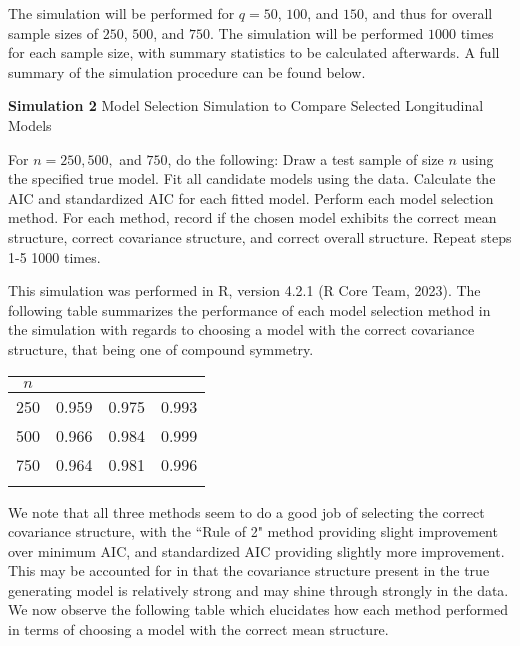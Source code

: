		The simulation will be performed for $q = 50$, $100$, and $150$, and thus for overall sample sizes of $250$, $500$, and $750$. The simulation will be performed $1000$ times for each sample size,
		with summary statistics to be calculated afterwards. A full summary of the simulation procedure can be found below.
		\begin{algorithm}[H]
			\caption*{\textbf{Simulation 2} Model Selection Simulation to Compare Selected Longitudinal Models}
			\begin{algorithmic}[1]
			  \Statex For $n = 250, 500,$ and $750$, do the following:
			  \State Draw a test sample of size $n$ using the specified true model.
			  \State Fit all candidate models using the data.
			  \State Calculate the AIC and standardized AIC for each fitted model.
			  \State Perform each model selection method.
			  \State For each method, record if the chosen model exhibits the correct mean structure, correct covariance structure, and correct overall structure.
			  \State Repeat steps 1-5 1000 times.
			\end{algorithmic}
		\end{algorithm}

		This simulation was performed in R, version 4.2.1 (R Core Team, 2023). The following table summarizes the performance of each model selection method in the simulation with
		regards to choosing a model with the correct covariance structure, that being one of compound symmetry.

		\begin{table}[H]
			\centering
			\small\addtolength{\tabcolsep}{-3pt}
			\setlength\extrarowheight{-3pt}
			{
			\begin{tabular}{ c|c|c|c}
			$n$ & \vtop{\hbox{\strut Minimum AIC}\hbox{\strut Accuracy}} & \vtop{\hbox{\strut AIC Rule of 2}\hbox{\strut Accuracy}} & \vtop{\hbox{\strut Standardized AIC}\hbox{\strut Accuracy}} \\
			 \hline
			 250 & 0.959  &  0.975 &  0.993 \\
			 500 & 0.966  &  0.984 &  0.999 \\
			 750 & 0.964  &  0.981 &  0.996 \\
			 \Xhline{3\arrayrulewidth}
			\end{tabular}
			}
		\end{table}

		We note that all three methods seem to do a good job of selecting the correct covariance structure, with the ``Rule of 2" method providing slight improvement over minimum AIC, and
		standardized AIC providing slightly more improvement. This may be accounted for in that the covariance structure present in the true generating model is relatively strong and may
		shine through strongly in the data. We now observe the following table which elucidates how each method performed in terms of choosing a model with the correct mean structure.

